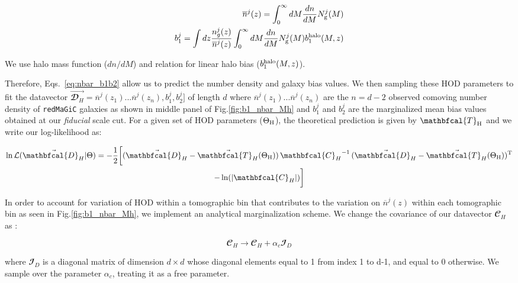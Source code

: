 \documentclass[aps, prd,twocolumn,superscriptaddress,nofootinbib,preprintnumbers]{revtex4-1}
\newcommand{\redmagic}{\texttt{redMaGiC} }
\begin{document}
\begin{linenomath*}
\begin{align}\label{eq:nbar_b1b2}
\nonumber    \overline{n}^j(z) = \int_{0}^{\infty} dM \frac{dn}{dM} N^{j}_{\rm g}(M) \\
\nonumber    b^{j}_1 = \int dz \frac{n^j_g(z)}{\overline{n}^j(z)} \int_{0}^{\infty} dM \frac{dn}{dM} N^{j}_{\rm g}(M) b^{\rm halo}_{1}(M,z)\\
\end{align}
\end{linenomath*}
We use \cite{Tinker_2008} halo mass function ($dn/dM$) and \cite{Tinker_2010} relation for linear halo bias ($b^{\rm halo}_{1}(M,z)$). 

Therefore, Eqs.~\ref{eq:nbar_b1b2} allow us to predict the number density and galaxy bias values. We then sampling these HOD parameters to fit the datavector $\vec{\mathbfcal{D}_H} = \overline{n}^j(z_1)...\overline{n}^j(z_{n}),b^j_1,b^j_2]$ of length $d$ where $\overline{n}^j(z_1)...\overline{n}^j(z_{n})$ are the $n=d-2$ observed comoving number density of \redmagic galaxies as shown in middle panel of Fig.\ref{fig:b1_nbar_Mh} and $b^j_1$ and $b^j_2$ are the marginalized mean bias values obtained at our \textit{fiducial} scale cut. For a given set of HOD parameters ($\Theta_{\rm H}$), the theoretical prediction is given by $\mathbfcal{T}_{\rm H}$ and we write our log-likelihood as:
\begin{linenomath*}
\begin{multline}
    \ln \mathcal{L}(\vec{\mathbfcal{D}_H}|\Theta) = -\frac{1}{2} \bigg[ (\vec{\mathbfcal{D}_H} - \vec{\mathbfcal{T}_H}(\Theta_{\rm H})) \, {\mathbfcal{C}_H}^{-1} \,  (\vec{\mathbfcal{D}_H} - \vec{\mathbfcal{T}_H}(\Theta_{\rm H}))^{\rm T} \\ -  \ln(|\mathbfcal{C}_H|) \bigg]
\end{multline}
\end{linenomath*}
In order to account for variation of HOD within a tomographic bin that contributes to the variation on $\overline{n}^j(z)$ within each tomographic bin as seen in Fig.\ref{fig:b1_nbar_Mh}, we implement an analytical marginalization scheme. We change the covariance of our datavector $\mathbfcal{C}_H$ as :
\begin{linenomath*}
\begin{equation}
    \mathbfcal{C}_H \to \mathbfcal{C}_H + \alpha_{c} \mathbfcal{I}_D
\end{equation}
\end{linenomath*}
where $\mathbfcal{I}_D$ is a diagonal matrix of dimension $d\times d$ whose diagonal elements equal to 1 from index 1 to d-1, and equal to 0 otherwise. We sample over the parameter $\alpha_{c}$, treating it as a free parameter. 







\bsp	%
\label{lastpage}

% 
%  
\end{document}
